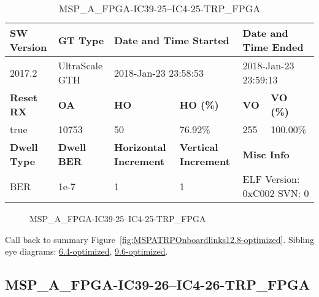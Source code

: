 \begin{table}[h]
\centering
\caption{MSP\_A\_FPGA-IC39-25--IC4-25-TRP\_FPGA}
\label{tab:MSPAFPGAIC3925IC425TRPFPGA12.8-optimized}
\begin{tabular}{@{}|l|l|l|l|l|l|@{}}
\toprule
\textbf{SW Version}                & \textbf{GT Type}   & \multicolumn{2}{l|}{\textbf{Date and Time Started}}            & \multicolumn{2}{l|}{\textbf{Date and Time Ended}}        \\ \midrule
2017.2                       & UltraScale GTH          & \multicolumn{2}{l|}{2018-Jan-23 23:58:53}                   & \multicolumn{2}{l|}{2018-Jan-23 23:59:13}               \\ \midrule
\textbf{Reset RX}                  & \textbf{OA} & \textbf{HO}   & \textbf{HO (\%)} & \textbf{VO} & \textbf{VO (\%)} \\ \midrule
true & 10753        & 50          & 76.92\%        & 255        & 100.00\%       \\ \midrule
\textbf{Dwell Type}                & \textbf{Dwell BER} & \textbf{Horizontal Increment} & \textbf{Vertical Increment}    & \multicolumn{2}{l|}{\textbf{Misc Info}}                  \\ \midrule
BER                            & 1e-7        & 1        & 1           & \multicolumn{2}{l|}{ELF Version: 0xC002 SVN: 0}                         \\ \bottomrule
\end{tabular}
\end{table}

\begin{figure}[h]
\caption{MSP\_A\_FPGA-IC39-25--IC4-25-TRP\_FPGA} \label{fig:MSPAFPGAIC3925IC425TRPFPGA12.8-optimized}
\end{figure}

Call back to summary Figure~\ref{fig:MSPATRPOnboardlinks12.8-optimized}.
Sibling eye diagrams: \hyperref[sec:MSPAFPGAIC3925IC425TRPFPGA6.4-optimized]{6.4-optimized}, \hyperref[sec:MSPAFPGAIC3925IC425TRPFPGA9.6-optimized]{9.6-optimized}.

\clearpage
\newpage


\subsection{MSP\_A\_FPGA-IC39-26--IC4-26-TRP\_FPGA}\label{sec:MSPAFPGAIC3926IC426TRPFPGA12.8-optimized}

